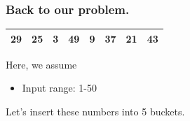 \documentclass[pdf]{beamer}
\begin{document}
\begin{frame}
	\frametitle{Back to our problem.}
		\begin{table}[h]
			\centering
			\begin{tabular}{|c|c|c|c|c|c|c|c|}
				\hline
				29 & 25 & 3 & 49 & 9 & 37 & 21 & 43\\
				\hline
			\end{tabular}
		\end{table}
		\pause
		Here, we assume
		\begin{itemize}
			\item Input range: 1-50
		\end{itemize}
\end{frame}

\begin{frame}
		\item Let's insert these numbers into 5 buckets.
\end{frame}
\end{document}
